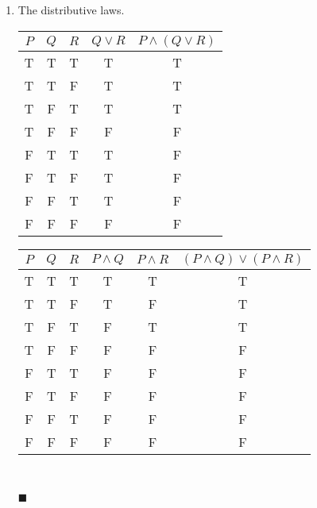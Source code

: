 \documentclass{report}
\newcommand{\qed}{\ \\\strut\hfill$\blacksquare$\vspace{1em}}
\begin{document}
\begin{enumerate}[leftmargin=*]
\begin{enumerate}
              \item The distributive laws.
                    \begin{center}
                        \begin{tabular}{ccccc}
                            $P$ & $Q$ & $R$ & $Q \vee R$ & $P \wedge(Q \vee R)$ \\
                            \hline
                            T   & T   & T   & T          & T                    \\
                            T   & T   & F   & T          & T                    \\
                            T   & F   & T   & T          & T                    \\
                            T   & F   & F   & F          & F                    \\
                            F   & T   & T   & T          & F                    \\
                            F   & T   & F   & T          & F                    \\
                            F   & F   & T   & T          & F                    \\
                            F   & F   & F   & F          & F
                        \end{tabular}
                        \hspace{2em}
                        \begin{tabular}{cccccc}
                            $P$ & $Q$ & $R$ & $P \wedge Q$ & $P \wedge R$ & $(P \wedge Q) \vee(P \wedge R)$ \\
                            \hline
                            T   & T   & T   & T            & T            & T                               \\
                            T   & T   & F   & T            & F            & T                               \\
                            T   & F   & T   & F            & T            & T                               \\
                            T   & F   & F   & F            & F            & F                               \\
                            F   & T   & T   & F            & F            & F                               \\
                            F   & T   & F   & F            & F            & F                               \\
                            F   & F   & T   & F            & F            & F                               \\
                            F   & F   & F   & F            & F            & F
                        \end{tabular}
                    \end{center}\qed


\end{enumerate}
\end{enumerate}
\end{document}
